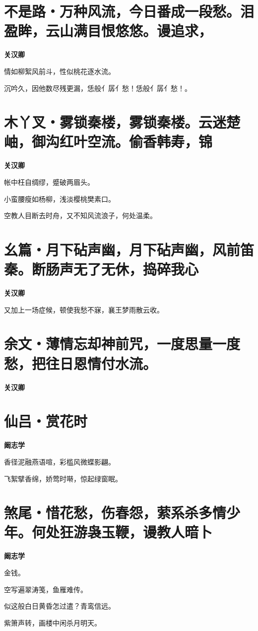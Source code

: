 \documentclass[12pt,a4paper]{ctexbook}
\begin{document}
\section{不是路・万种风流，今日番成一段愁。泪盈眸，云山满目恨悠悠。谩追求，}
\textbf{关汉卿}\par\vspace{0.5em}
情如柳絮风前斗，性似桃花逐水流。\par
沉吟久，因他数尽残更漏，恁般亻孱亻愁！恁般亻孱亻愁！。\par

\section{木丫叉・雾锁秦楼，雾锁秦楼。云迷楚岫，御沟红叶空流。偷香韩寿，锦}
\textbf{关汉卿}\par\vspace{0.5em}
帐中枉自绸缪，蹙破两眉头。\par
小蛮腰瘦如杨柳，浅淡樱桃樊素口。\par
空教人目断去时舟，又不知风流浪子，何处温柔。\par

\section{幺篇・月下砧声幽，月下砧声幽，风前笛秦。断肠声无了无休，捣碎我心}
\textbf{关汉卿}\par\vspace{0.5em}
又加上一场症候，顿使我愁不寐，襄王梦雨散云收。\par

\section{余文・薄情忘却神前咒，一度思量一度愁，把往日恩情付水流。}
\textbf{关汉卿}\par\vspace{0.5em}

\section{仙吕・赏花时}
\textbf{阚志学}\par\vspace{0.5em}
香径泥融燕语喧，彩槛风微蝶影翩。\par
飞絮擘香绵，娇莺时啭，惊起绿窗眠。\par

\section{煞尾・惜花愁，伤春怨，萦系杀多情少年。何处狂游袅玉鞭，谩教人暗卜}
\textbf{阚志学}\par\vspace{0.5em}
金钱。\par
空写遍翠涛笺，鱼雁难传。\par
似这般白日黄昏怎过遣？青鸾信远。\par
紫箫声转，画楼中闲杀月明天。\par
\end{document}
